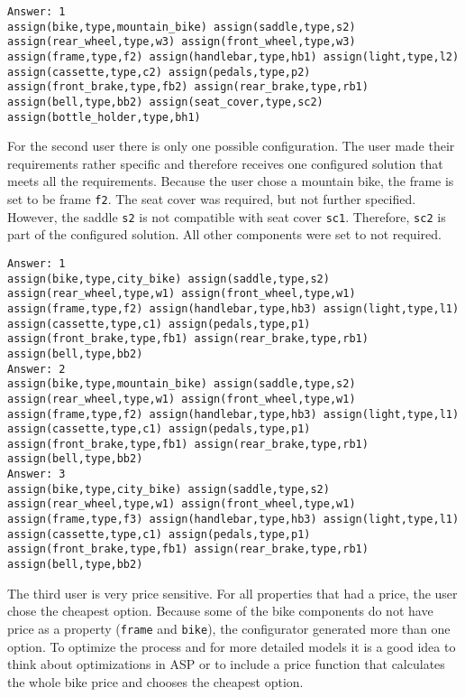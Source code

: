 \begin{lstlisting}[caption = {Solution User 2}, basicstyle=\ttfamily, label = {sol2}]
Answer: 1
assign(bike,type,mountain_bike) assign(saddle,type,s2) assign(rear_wheel,type,w3) assign(front_wheel,type,w3) assign(frame,type,f2) assign(handlebar,type,hb1) assign(light,type,l2) assign(cassette,type,c2) assign(pedals,type,p2) assign(front_brake,type,fb2) assign(rear_brake,type,rb1) assign(bell,type,bb2) assign(seat_cover,type,sc2) 
assign(bottle_holder,type,bh1)
\end{lstlisting}

For the second user there is only one possible configuration. The user made their requirements rather specific and therefore receives one configured solution that meets all the requirements. Because the user chose a mountain bike, the frame is set to be frame \texttt{f2}. The seat cover was required, but not further specified. However, the saddle \texttt{s2} is not compatible with seat cover \texttt{sc1}. Therefore, \texttt{sc2} is part of the configured solution. All other components were set to not required. 

\begin{lstlisting}[caption = {Solution User 3}, basicstyle=\ttfamily, label = {sol3}]
Answer: 1
assign(bike,type,city_bike) assign(saddle,type,s2) assign(rear_wheel,type,w1) assign(front_wheel,type,w1) assign(frame,type,f2) assign(handlebar,type,hb3) assign(light,type,l1) assign(cassette,type,c1) assign(pedals,type,p1) assign(front_brake,type,fb1) assign(rear_brake,type,rb1) assign(bell,type,bb2)
Answer: 2
assign(bike,type,mountain_bike) assign(saddle,type,s2) assign(rear_wheel,type,w1) assign(front_wheel,type,w1) assign(frame,type,f2) assign(handlebar,type,hb3) assign(light,type,l1) assign(cassette,type,c1) assign(pedals,type,p1) assign(front_brake,type,fb1) assign(rear_brake,type,rb1) assign(bell,type,bb2)
Answer: 3
assign(bike,type,city_bike) assign(saddle,type,s2) assign(rear_wheel,type,w1) assign(front_wheel,type,w1) assign(frame,type,f3) assign(handlebar,type,hb3) assign(light,type,l1) assign(cassette,type,c1) assign(pedals,type,p1) assign(front_brake,type,fb1) assign(rear_brake,type,rb1) assign(bell,type,bb2)
\end{lstlisting}

The third user is very price sensitive. For all properties that had a price, the user chose the cheapest option. Because some of the bike components do not have price as a property (\texttt{frame} and \texttt{bike}), the configurator generated more than one option. To optimize the process and for more detailed models it is a good idea to think about optimizations in ASP or to include a price function that calculates the whole bike price and chooses the cheapest option. 